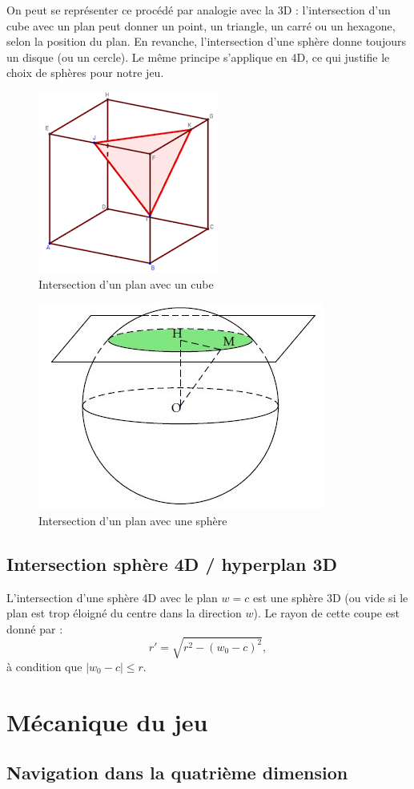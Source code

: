 \documentclass[11pt,a4paper]{article}
\begin{document}
On peut se représenter ce procédé par analogie avec la 3D : l’intersection d’un cube avec un plan peut donner un point, un triangle, un carré ou un hexagone, selon la position du plan. En revanche, l’intersection d’une sphère donne toujours un disque (ou un cercle). Le même principe s’applique en 4D, ce qui justifie le choix de sphères pour notre jeu.
\begin{figure}[H]
	\centering
	\includegraphics[width=0.3\linewidth]{intersection-cube}
	\caption{Intersection d’un plan avec un cube}
	\label{fig:inter-plan-cube}
\end{figure}

\begin{figure}[H]
	\centering
	\includegraphics[width=0.3\linewidth]{intersection-sphere}
	\caption{Intersection d’un plan avec une sphère}
	\label{fig:inter-plan-sphere}
\end{figure}

\subsection{Intersection sphère 4D / hyperplan 3D}

L’intersection d’une sphère 4D avec le plan $w = c$ est une sphère 3D (ou vide si le plan est trop éloigné du centre dans la direction $w$). Le rayon de cette coupe est donné par :
\[
	r' = \sqrt{r^2 - (w_0 - c)^2},
\]
à condition que $|w_0 - c| \leq r$.

\section{Mécanique du jeu}

\subsection{Navigation dans la quatrième dimension}
\end{document}
